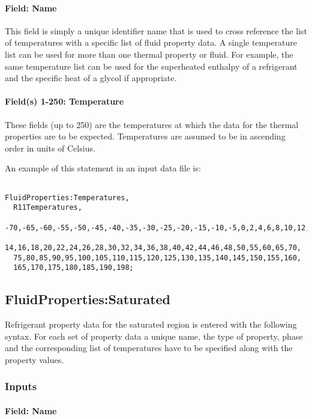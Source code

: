 \paragraph{Field: Name}\label{field-name-1-017}

This field is simply a unique identifier name that is used to cross reference the list of temperatures with a specific list of fluid property data. A single temperature list can be used for more than one thermal property or fluid. For example, the same temperature list can be used for the superheated enthalpy of a refrigerant and the specific heat of a glycol if appropriate.

\paragraph{Field(s) 1-250: Temperature}\label{fields-1-250-temperature}

These fields (up to 250) are the temperatures at which the data for the thermal properties are to be expected. Temperatures are assumed to be in ascending order in units of Celsius.

An example of this statement in an input data file is:

\begin{lstlisting}

FluidProperties:Temperatures,
  R11Temperatures,
  -70,-65,-60,-55,-50,-45,-40,-35,-30,-25,-20,-15,-10,-5,0,2,4,6,8,10,12,
  14,16,18,20,22,24,26,28,30,32,34,36,38,40,42,44,46,48,50,55,60,65,70,
  75,80,85,90,95,100,105,110,115,120,125,130,135,140,145,150,155,160,
  165,170,175,180,185,190,198;
\end{lstlisting}

\subsection{FluidProperties:Saturated}\label{fluidpropertiessaturated}

Refrigerant property data for the saturated region is entered with the following syntax. For each set of property data a unique name, the type of property, phase and the corresponding list of temperatures have to be specified along with the property values.

\subsubsection{Inputs}\label{inputs-3-015}

\paragraph{Field: Name}\label{field-name-2-016}

